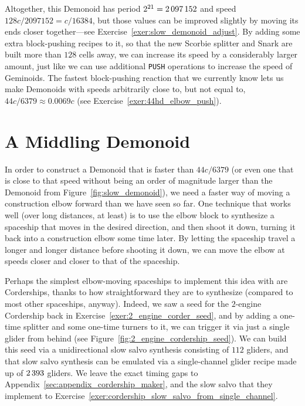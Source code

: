 Altogether, this Demonoid has period $2^{21} = 2{\,}097{\,}152$ and speed $128c/2097152 = c/16384$, but those values can be improved slightly by moving its ends closer together---see Exercise~\ref{exer:slow_demonoid_adjust}. By adding some extra block-pushing recipes to it, so that the new Scorbie splitter and Snark are built more than $128$ cells away, we can increase its speed by a considerably larger amount, just like we can use additional \texttt{PUSH} operations to increase the speed of Geminoids. The fastest block-pushing reaction that we currently know lets us make Demonoids with speeds arbitrarily close to, but not equal to, $44c/6379 \approx 0.0069c$ (see Exercise~\ref{exer:44hd_elbow_push}).


\section{A Middling Demonoid}\label{sec:medium_demonoid}

In order to construct a Demonoid that is faster than $44c/6379$ (or even one that is close to that speed without being an order of magnitude larger than the Demonoid from Figure~\ref{fig:slow_demonoid}), we need a faster way of moving a construction elbow forward than we have seen so far. One technique that works well (over long distances, at least) is to use the elbow block to synthesize a spaceship that moves in the desired direction, and then shoot it down, turning it back into a construction elbow some time later. By letting the spaceship travel a longer and longer distance before shooting it down, we can move the elbow at speeds closer and closer to that of the spaceship.

Perhaps the simplest elbow-moving spaceships to implement this idea with are Corderships, thanks to how straightforward they are to synthesize (compared to most other spaceships, anyway). Indeed, we saw a seed for the $2$-engine Cordership back in Exercise~\ref{exer:2_engine_corder_seed}, and by adding a one-time splitter and some one-time turners to it, we can trigger it via just a single glider from behind (see Figure~\ref{fig:2_engine_cordership_seed}). We can build this seed via a unidirectional slow salvo synthesis consisting of $112$ gliders, and that slow salvo synthesis can be emulated via a single-channel glider recipe made up of $2{\,}393$ gliders. We leave the exact timing gaps to Appendix~\ref{sec:appendix_cordership_maker}, and the slow salvo that they implement to Exercise~\ref{exer:cordership_slow_salvo_from_single_channel}.


